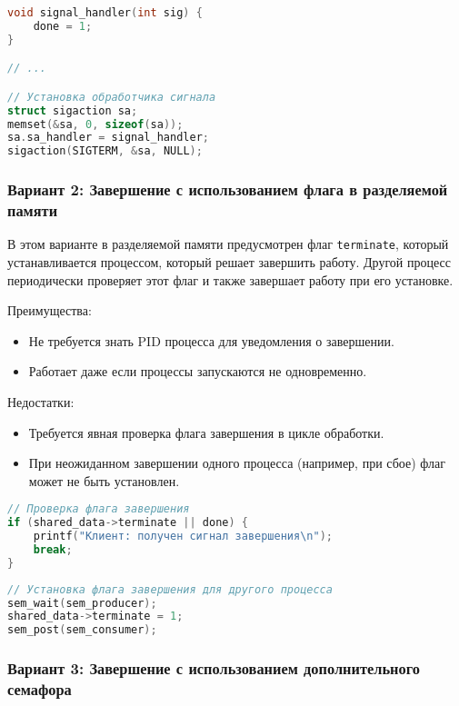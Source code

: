 \documentclass[a4paper,12pt]{article}
\begin{document}
\begin{lstlisting}[language=C, caption=Обработчик сигнала в клиенте]
void signal_handler(int sig) {
    done = 1;
}

// ...

// Установка обработчика сигнала
struct sigaction sa;
memset(&sa, 0, sizeof(sa));
sa.sa_handler = signal_handler;
sigaction(SIGTERM, &sa, NULL);
\end{lstlisting}

\subsubsection{Вариант 2: Завершение с использованием флага в разделяемой памяти}

В этом варианте в разделяемой памяти предусмотрен флаг \texttt{terminate}, который устанавливается процессом, который решает завершить работу. Другой процесс периодически проверяет этот флаг и также завершает работу при его установке.

Преимущества:
\begin{itemize}
    \item Не требуется знать PID процесса для уведомления о завершении.
    \item Работает даже если процессы запускаются не одновременно.
\end{itemize}

Недостатки:
\begin{itemize}
    \item Требуется явная проверка флага завершения в цикле обработки.
    \item При неожиданном завершении одного процесса (например, при сбое) флаг может не быть установлен.
\end{itemize}

\begin{lstlisting}[language=C, caption=Проверка флага завершения]
// Проверка флага завершения
if (shared_data->terminate || done) {
    printf("Клиент: получен сигнал завершения\n");
    break;
}
\end{lstlisting}

\begin{lstlisting}[language=C, caption=Установка флага завершения]
// Установка флага завершения для другого процесса
sem_wait(sem_producer);
shared_data->terminate = 1;
sem_post(sem_consumer);
\end{lstlisting}

\subsubsection{Вариант 3: Завершение с использованием дополнительного семафора}
\end{document}
